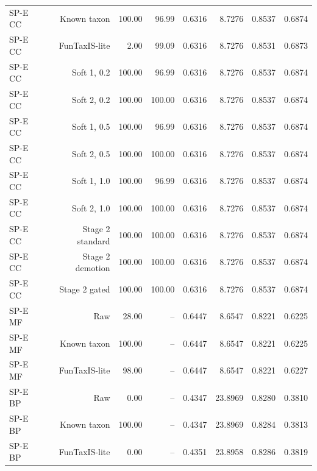 \begin{longtable}{lrrrrrrr}
SP-E CC & Known taxon & 100.00 & 96.99 & 0.6316 & 8.7276 & 0.8537 & 0.6874 \\
SP-E CC & FunTaxIS-lite & 2.00 & 99.09 & 0.6316 & 8.7276 & 0.8531 & 0.6873 \\
SP-E CC & Soft 1, 0.2 & 100.00 & 96.99 & 0.6316 & 8.7276 & 0.8537 & 0.6874 \\
SP-E CC & Soft 2, 0.2 & 100.00 & 100.00 & 0.6316 & 8.7276 & 0.8537 & 0.6874 \\
SP-E CC & Soft 1, 0.5 & 100.00 & 96.99 & 0.6316 & 8.7276 & 0.8537 & 0.6874 \\
SP-E CC & Soft 2, 0.5 & 100.00 & 100.00 & 0.6316 & 8.7276 & 0.8537 & 0.6874 \\
SP-E CC & Soft 1, 1.0 & 100.00 & 96.99 & 0.6316 & 8.7276 & 0.8537 & 0.6874 \\
SP-E CC & Soft 2, 1.0 & 100.00 & 100.00 & 0.6316 & 8.7276 & 0.8537 & 0.6874 \\
SP-E CC & Stage 2 standard & 100.00 & 100.00 & 0.6316 & 8.7276 & 0.8537 & 0.6874 \\
SP-E CC & Stage 2 demotion & 100.00 & 100.00 & 0.6316 & 8.7276 & 0.8537 & 0.6874 \\
SP-E CC & Stage 2 gated & 100.00 & 100.00 & 0.6316 & 8.7276 & 0.8537 & 0.6874 \\
SP-E MF & Raw & 28.00 & -- & 0.6447 & 8.6547 & 0.8221 & 0.6225 \\
SP-E MF & Known taxon & 100.00 & -- & 0.6447 & 8.6547 & 0.8221 & 0.6225 \\
SP-E MF & FunTaxIS-lite & 98.00 & -- & 0.6447 & 8.6547 & 0.8221 & 0.6227 \\
SP-E BP & Raw & 0.00 & -- & 0.4347 & 23.8969 & 0.8280 & 0.3810 \\
SP-E BP & Known taxon & 100.00 & -- & 0.4347 & 23.8969 & 0.8284 & 0.3813 \\
SP-E BP & FunTaxIS-lite & 0.00 & -- & 0.4351 & 23.8958 & 0.8286 & 0.3819 \\
\bottomrule
\end{longtable}
\endgroup
